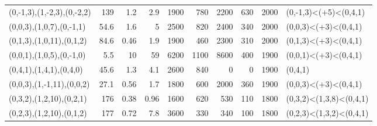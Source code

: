 \begin{tabular}{lrrrrrrrrl}
 (0,-1,3),(1,-2,3),(0,-2,2)  &      139   &                              1.2  &                            2.9  &                              1900 &                             780 &                              2200 &                             630 &       2000 & (0,-1,3)<(+5)<(0,4,1)   \\
 (0,0,3),(1,0,7),(0,-1,1)    &       54.6 &                              1.6  &                            5    &                              2500 &                             820 &                              2400 &                             340 &       2000 & (0,0,3)<(+3)<(0,4,1)    \\
 (0,1,3),(1,0,11),(0,1,2)    &       84.6 &                              0.46 &                            1.9  &                              1900 &                             460 &                              2300 &                             310 &       2000 & (0,1,3)<(+3)<(0,4,1)    \\
 (0,0,1),(1,0,5),(0,-1,0)    &        5.5 &                             10    &                           59    &                              6200 &                            1100 &                              8600 &                             400 &       1900 & (0,0,1)<(+3)<(0,4,1)    \\
 (0,4,1),(1,4,1),(0,4,0)     &       45.6 &                              1.3  &                            4.1  &                              2600 &                             840 &                                 0 &                               0 &       1900 & (0,4,1)                 \\
 (0,0,3),(1,-1,11),(0,0,2)   &       27.1 &                              0.56 &                            1.7  &                              1800 &                             600 &                              2000 &                             360 &       1900 & (0,0,3)<(+3)<(0,4,1)    \\
 (0,3,2),(1,2,10),(0,2,1)    &      176   &                              0.38 &                            0.96 &                              1600 &                             620 &                               530 &                             110 &       1800 & (0,3,2)<(1,3,8)<(0,4,1) \\
 (0,2,3),(1,2,10),(0,1,2)    &      177   &                              0.72 &                            7.8  &                              3600 &                             330 &                               340 &                             100 &       1800 & (0,2,3)<(1,3,2)<(0,4,1) \\

\end{tabular}
